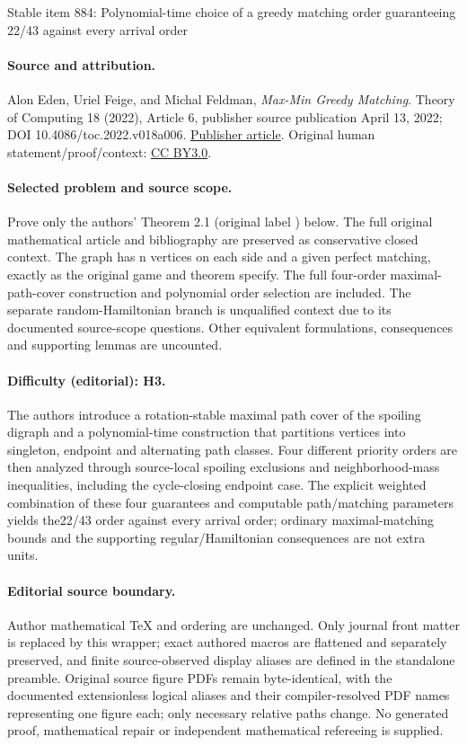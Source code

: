 \documentclass[11pt]{article}
\numberwithin{equation}{section}
\theoremstyle{definition}
\theoremstyle{plain}
\theoremstyle{plain}
\begin{document}
\begin{center}{\Large Stable item 884: Polynomial-time choice of a greedy matching order guaranteeing 22/43 against every arrival order}\end{center}
\paragraph{Source and attribution.}
Alon Eden, Uriel Feige, and Michal Feldman, \emph{Max-Min Greedy Matching}. Theory of Computing 18 (2022), Article 6, publisher source publication April 13, 2022; DOI 10.4086/toc.2022.v018a006. \href{https://theoryofcomputing.org/articles/v018a006/}{Publisher article}. Original human statement/proof/context: \href{https://creativecommons.org/licenses/by/3.0/}{CC BY3.0}.
\paragraph{Selected problem and source scope.}
Prove only the authors' Theorem 2.1 (original label ) below. The full original mathematical article and bibliography are preserved as conservative closed context. The graph has n vertices on each side and a given perfect matching, exactly as the original game and theorem specify. The full four-order maximal-path-cover construction and polynomial order selection are included. The separate random-Hamiltonian branch is unqualified context due to its documented source-scope questions. Other equivalent formulations, consequences and supporting lemmas are uncounted.
\paragraph{Difficulty (editorial): H3.}
The authors introduce a rotation-stable maximal path cover of the spoiling digraph and a polynomial-time construction that partitions vertices into singleton, endpoint and alternating path classes. Four different priority orders are then analyzed through source-local spoiling exclusions and neighborhood-mass inequalities, including the cycle-closing endpoint case. The explicit weighted combination of these four guarantees and computable path/matching parameters yields the22/43 order against every arrival order; ordinary maximal-matching bounds and the supporting regular/Hamiltonian consequences are not extra units.
\paragraph{Editorial source boundary.}
Author mathematical TeX and ordering are unchanged. Only journal front matter is replaced by this wrapper; exact authored macros are flattened and separately preserved, and finite source-observed display aliases are defined in the standalone preamble. Original source figure PDFs remain byte-identical, with the documented extensionless logical aliases and their compiler-resolved PDF names representing one figure each; only necessary relative paths change. No generated proof, mathematical repair or independent mathematical refereeing is supplied. 
\clearpage
\end{document}
